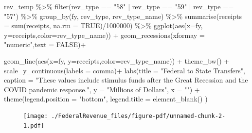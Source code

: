 \documentclass[
  letterpaper,
  DIV=11,
  numbers=noendperiod]{scrreport}
\newenvironment{Shaded}{\begin{snugshade}}{\end{snugshade}}
\newcommand{\AttributeTok}[1]{\textcolor[rgb]{0.40,0.45,0.13}{#1}}
\newcommand{\ConstantTok}[1]{\textcolor[rgb]{0.56,0.35,0.01}{#1}}
\newcommand{\DecValTok}[1]{\textcolor[rgb]{0.68,0.00,0.00}{#1}}
\newcommand{\FunctionTok}[1]{\textcolor[rgb]{0.28,0.35,0.67}{#1}}
\newcommand{\NormalTok}[1]{\textcolor[rgb]{0.00,0.23,0.31}{#1}}
\newcommand{\SpecialCharTok}[1]{\textcolor[rgb]{0.37,0.37,0.37}{#1}}
\newcommand{\StringTok}[1]{\textcolor[rgb]{0.13,0.47,0.30}{#1}}
\begin{document}
\begin{Shaded}
\begin{Highlighting}[]
\NormalTok{rev\_temp }\SpecialCharTok{\%\textgreater{}\%} 
  \FunctionTok{filter}\NormalTok{(rev\_type }\SpecialCharTok{==} \StringTok{"58"} \SpecialCharTok{|}\NormalTok{ rev\_type }\SpecialCharTok{==} \StringTok{"59"} \SpecialCharTok{|}\NormalTok{ rev\_type }\SpecialCharTok{==} \StringTok{"57"}\NormalTok{) }\SpecialCharTok{\%\textgreater{}\%} 
  \FunctionTok{group\_by}\NormalTok{(fy, rev\_type, rev\_type\_name) }\SpecialCharTok{\%\textgreater{}\%} 
  \FunctionTok{summarise}\NormalTok{(}\AttributeTok{receipts =} \FunctionTok{sum}\NormalTok{(receipts, }\AttributeTok{na.rm =} \ConstantTok{TRUE}\NormalTok{)}\SpecialCharTok{/}\DecValTok{1000000}\NormalTok{) }\SpecialCharTok{\%\textgreater{}\%} 
  \FunctionTok{ggplot}\NormalTok{(}\FunctionTok{aes}\NormalTok{(}\AttributeTok{x=}\NormalTok{fy, }\AttributeTok{y=}\NormalTok{receipts,}\AttributeTok{color=}\NormalTok{rev\_type\_name)) }\SpecialCharTok{+}
    \FunctionTok{geom\_recessions}\NormalTok{(}\AttributeTok{xformay =} \StringTok{"numeric"}\NormalTok{,}\AttributeTok{text =} \ConstantTok{FALSE}\NormalTok{)}\SpecialCharTok{+}

  \FunctionTok{geom\_line}\NormalTok{(}\FunctionTok{aes}\NormalTok{(}\AttributeTok{x=}\NormalTok{fy, }\AttributeTok{y=}\NormalTok{receipts,}\AttributeTok{color=}\NormalTok{rev\_type\_name)) }\SpecialCharTok{+}
      \FunctionTok{theme\_bw}\NormalTok{() }\SpecialCharTok{+}
  \FunctionTok{scale\_y\_continuous}\NormalTok{(}\AttributeTok{labels =}\NormalTok{ comma)}\SpecialCharTok{+}
  \FunctionTok{labs}\NormalTok{(}\AttributeTok{title =} \StringTok{"Federal to State Transfers"}\NormalTok{, }
       \AttributeTok{caption =} \StringTok{"These values include stimulus funds after the Great Recession and the COVID pandemic response."}\NormalTok{,}
       \AttributeTok{y =} \StringTok{"Millions of Dollars"}\NormalTok{, }\AttributeTok{x =} \StringTok{""}\NormalTok{) }\SpecialCharTok{+} 
  \FunctionTok{theme}\NormalTok{(}\AttributeTok{legend.position =} \StringTok{"bottom"}\NormalTok{, }\AttributeTok{legend.title =} \FunctionTok{element\_blank}\NormalTok{()  )}
\end{Highlighting}
\end{Shaded}

\begin{figure}[H]

{\centering \texttt{[image: ./FederalRevenue\_files/figure-pdf/unnamed-chunk-2-1.pdf]}

}

\end{figure}
\end{document}

